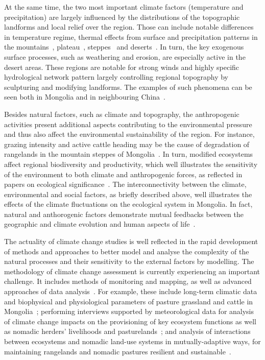 \documentclass[geosciences,article,accept,pdftex,oneauthor]{Definitions/mdpi}
\begin{document}
At the same time, the two most important climate factors (temperature and precipitation) are largely influenced by the distributions of the topographic landforms and local relief over the region. Those can include notable differences in temperature regime, thermal effects from surface and precipitation patterns in the mountains~\cite{LEHMKUHL201824,LEHMKUHL201212}, plateau~\cite{LUO2021105505,Baoetal2015,CHEN2022108560}, steppes~\cite{Zemmrich} and deserts~\cite{LI2021105259,LUO201957,RAHMAN2022391,SAAVEDRA2020104711,LEI2021105661}. In turn, the key exogenous surface processes, such as weathering and erosion, are especially active in the desert areas. These regions are notable for strong winds and highly specific hydrological network pattern largely controlling regional topography by sculpturing and modifying {landforms}. The examples of such phenomena can be seen both in Mongolia and in neighbouring China~\cite{DAI2022115518,XU2020100496,LYU2021111488}. 

Besides natural factors, such as climate and topography, the anthropogenic activities present additional aspects contributing to the environmental pressure and thus also affect the environmental sustainability of the region. For instance, grazing intensity and active cattle heading may be the cause of degradation of rangelands in the mountain steppes of Mongolia~\cite{Otgontuya,Khishigdorj,ADDISON201337}. In turn, modified ecosystems affect regional biodiversity and productivity, which well illustrates the sensitivity of the environment to both climate and anthropogenic forces, as reflected in papers on ecological significance~\cite{Klauco2013,Lemenkova2021c,Bumtsend}. The interconnectivity between the climate, environmental and social factors, as briefly described above, well illustrates the effects of the climate fluctuations on the ecological system in Mongolia. In fact, natural and anthorogenic factors demonstrate mutual feedbacks between the geographic and climate evolution and human aspects of life~\cite{YU201977,XU2021104333,TUGJAMBA2021101360}.

The actuality of climate change studies is well reflected in the rapid development of methods and approaches to better model and analyse the complexity of the natural processes and their sensitivity to the external factors by modelling. The methodology of climate change assessment is currently experiencing an important challenge. It includes methods of monitoring and mapping, as well as advanced approaches of data analysis~\cite{FENG2020102861,WANG201768,GUO2021141481}. For example, these include long-term climatic data and biophysical and physiological parameters of pasture grassland and cattle in Mongolia~\cite{Bolortsetseg,SASAKI2022104690}; performing interviews supported by meteorological data for analysis of climate change impacts on the provisioning of key ecosystem functions as well as nomadic herders' livelihoods and pasturelands~\cite{Tugjamba}; and analysis of interactions between ecosystems and nomadic land-use systems in mutually-adaptive ways, for maintaining rangelands and nomadic pastures resilient and sustainable~\cite{Chuluun}. 
\end{document}
